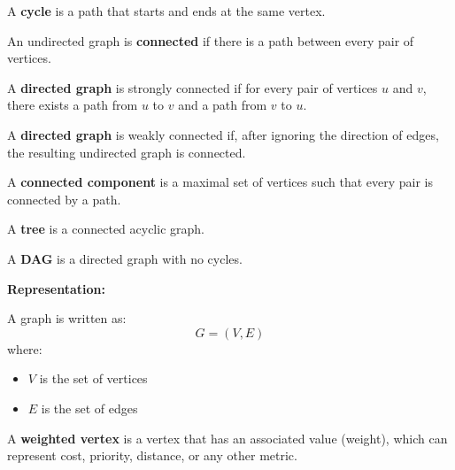 \documentclass[11pt,a4paper,openany]{book}
\begin{document}
\begin{defnbox}[title=Cycle]
A \textbf{cycle} is a path that starts and ends at the same vertex.
\end{defnbox}

\begin{defnbox}[title=Connected Graph]
An undirected graph is \textbf{connected} if there is a path between every pair of vertices.
\end{defnbox}

\begin{defnbox}[title=Strongly Connected Graph]
A \textbf{directed graph} is strongly connected if for every pair of vertices $u$ and $v$, there exists a path from $u$ to $v$ and a path from $v$ to $u$.
\end{defnbox}

\begin{defnbox}[title=Weakly Connected Graph]
A \textbf{directed graph} is weakly connected if, after ignoring the direction of edges, the resulting undirected graph is connected.
\end{defnbox}

\begin{defnbox}[title=Connected Components]
A \textbf{connected component} is a maximal set of vertices such that every pair is connected by a path.
\end{defnbox}

\begin{defnbox}[title=Tree (Graph Theory)]
A \textbf{tree} is a connected acyclic graph.
\end{defnbox}

\begin{defnbox}[title=Directed Acyclic Graph (DAG)]
A \textbf{DAG} is a directed graph with no cycles.
\end{defnbox}


\textbf{Representation:}

A graph is written as:
\[
G = (V, E)
\]
where:
\begin{itemize}
    \item $V$ is the set of vertices
    \item $E$ is the set of edges
\end{itemize}


\begin{defnbox}[title=Weighted Vertex]
A \textbf{weighted vertex} is a vertex that has an associated value (weight), which can represent cost, priority, distance, or any other metric.
\end{defnbox}
\end{document}
